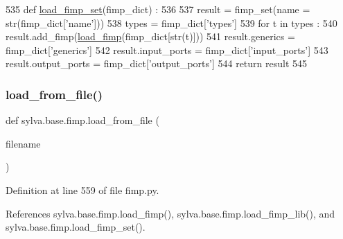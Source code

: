 \begin{DoxyCode}
535 \textcolor{keyword}{def }\hyperlink{namespacesylva_1_1base_1_1fimp_ad713bc31de8ee05df0c1184daba1ffb8}{load\_fimp\_set}(fimp\_dict) :
536 
537   result = fimp\_set(name = str(fimp\_dict[\textcolor{stringliteral}{'name'}]))
538   types = fimp\_dict[\textcolor{stringliteral}{'types'}]
539   \textcolor{keywordflow}{for} t \textcolor{keywordflow}{in} types :
540     result.add\_fimp(\hyperlink{namespacesylva_1_1base_1_1fimp_a49222336c8f368ae3381e7b8b456a8b4}{load\_fimp}(fimp\_dict[str(t)]))
541   result.generics = fimp\_dict[\textcolor{stringliteral}{'generics'}]
542   result.input\_ports = fimp\_dict[\textcolor{stringliteral}{'input\_ports'}]
543   result.output\_ports = fimp\_dict[\textcolor{stringliteral}{'output\_ports'}]
544   \textcolor{keywordflow}{return} result
545 
\end{DoxyCode}
\mbox{\label{namespacesylva_1_1base_1_1fimp_ae9ea3885312a946a5a94bd8b2eef9b95}} 
\subsubsection{\texorpdfstring{load\+\_\+from\+\_\+file()}{load\_from\_file()}}
{\footnotesize\ttfamily def sylva.\+base.\+fimp.\+load\+\_\+from\+\_\+file (\begin{DoxyParamCaption}\item[{}]{filename }\end{DoxyParamCaption})}



Definition at line 559 of file fimp.\+py.



References sylva.\+base.\+fimp.\+load\+\_\+fimp(), sylva.\+base.\+fimp.\+load\+\_\+fimp\+\_\+lib(), and sylva.\+base.\+fimp.\+load\+\_\+fimp\+\_\+set().


